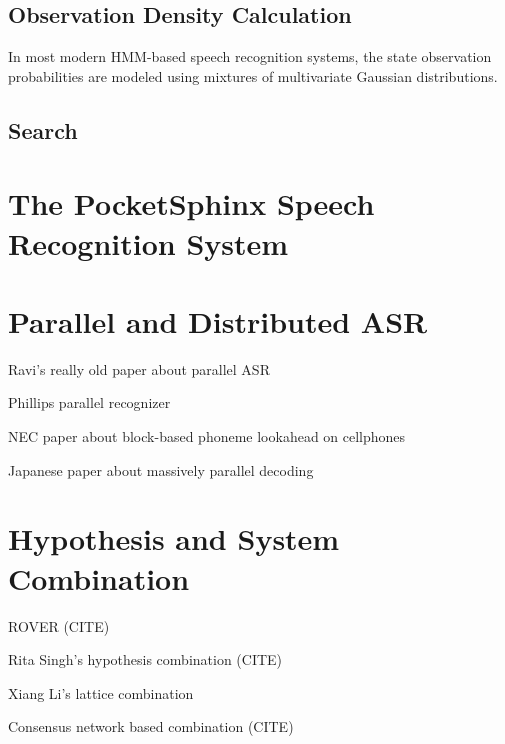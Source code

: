 \documentclass{article}
\begin{document}
\subsection{Observation Density Calculation}
\label{sec:gmm}

In most modern HMM-based speech recognition systems, the state
observation probabilities are modeled using mixtures of multivariate
Gaussian distributions.


\subsection{Search}
\label{sec:search}

\section{The PocketSphinx Speech Recognition System}
\label{sec:pocketsphinx}

\section{Parallel and Distributed ASR}
\label{sec:pdasr}

Ravi's really old paper about parallel ASR

Phillips parallel recognizer \cite{phillips1999}

NEC paper about block-based phoneme lookahead on cellphones \cite{ishikawa2006}

Japanese paper about massively parallel decoding

\section{Hypothesis and System Combination}
\label{sec:hypcomb}

ROVER (CITE)

Rita Singh's hypothesis combination (CITE)

Xiang Li's lattice combination \cite{li2005}

Consensus network \cite{mangu1999} based combination (CITE)




\end{document}
